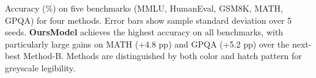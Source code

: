 \caption{Accuracy (\%) on five benchmarks (MMLU, HumanEval, GSM8K, MATH, GPQA) for four methods. Error bars show sample standard deviation over 5 seeds. \textbf{OursModel} achieves the highest accuracy on all benchmarks, with particularly large gains on MATH (+4.8 pp) and GPQA (+5.2 pp) over the next-best Method-B. Methods are distinguished by both color and hatch pattern for greyscale legibility.}

